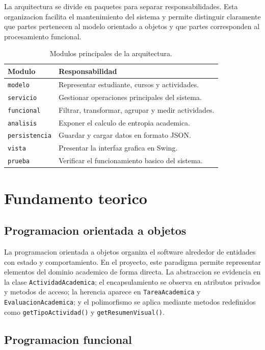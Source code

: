 \documentclass[12pt]{article}
\begin{document}
La arquitectura se divide en paquetes para separar responsabilidades. Esta organizacion facilita el mantenimiento del sistema y permite distinguir claramente que partes pertenecen al modelo orientado a objetos y que partes corresponden al procesamiento funcional.

\begin{table}[H]
\centering
\begin{tabular}{ll}
\toprule
\textbf{Modulo} & \textbf{Responsabilidad} \\
\midrule
\texttt{modelo} & Representar estudiante, cursos y actividades. \\
\texttt{servicio} & Gestionar operaciones principales del sistema. \\
\texttt{funcional} & Filtrar, transformar, agrupar y medir actividades. \\
\texttt{analisis} & Exponer el calculo de entropia academica. \\
\texttt{persistencia} & Guardar y cargar datos en formato JSON. \\
\texttt{vista} & Presentar la interfaz grafica en Swing. \\
\texttt{prueba} & Verificar el funcionamiento basico del sistema. \\
\bottomrule
\end{tabular}
\caption{Modulos principales de la arquitectura.}
\label{tab:modulos}
\end{table}

\section{Fundamento teorico}

\subsection{Programacion orientada a objetos}

La programacion orientada a objetos organiza el software alrededor de entidades con estado y comportamiento. En el proyecto, este paradigma permite representar elementos del dominio academico de forma directa. La abstraccion se evidencia en la clase \texttt{ActividadAcademica}; el encapsulamiento se observa en atributos privados y metodos de acceso; la herencia aparece en \texttt{TareaAcademica} y \texttt{EvaluacionAcademica}; y el polimorfismo se aplica mediante metodos redefinidos como \texttt{getTipoActividad()} y \texttt{getResumenVisual()}.

\subsection{Programacion funcional}
\end{document}
